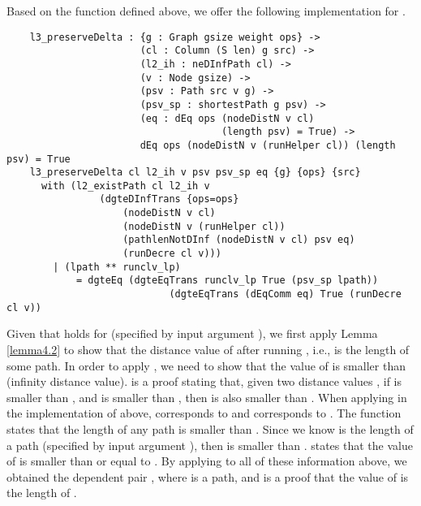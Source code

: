 Based on the  function defined above, we offer the following implementation for . 
\begin{lstlisting}
	l3_preserveDelta : {g : Graph gsize weight ops} ->
	                   (cl : Column (S len) g src) ->
	                   (l2_ih : neDInfPath cl) ->
	                   (v : Node gsize) ->
	                   (psv : Path src v g) ->
	                   (psv_sp : shortestPath g psv) ->
	                   (eq : dEq ops (nodeDistN v cl) 
	                   				 (length psv) = True) ->
	                   dEq ops (nodeDistN v (runHelper cl)) (length psv) = True
	l3_preserveDelta cl l2_ih v psv psv_sp eq {g} {ops} {src}
	  with (l2_existPath cl l2_ih v 
	  			(dgteDInfTrans {ops=ops} 
	  				(nodeDistN v cl) 
	  				(nodeDistN v (runHelper cl)) 
	  				(pathlenNotDInf (nodeDistN v cl) psv eq) 
	  				(runDecre cl v)))
	    | (lpath ** runclv_lp) 
	    	= dgteEq (dgteEqTrans runclv_lp True (psv_sp lpath))
	    					(dgteEqTrans (dEqComm eq) True (runDecre cl v))
\end{lstlisting}

Given that  holds for  (specified by input argument ), we first apply Lemma \ref{lemma4.2}  to show that the distance value of  after running , i.e.,  is the length of some  path. In order to apply , we need to show that the value of  is smaller than  (infinity distance value).  is a proof stating that, given two distance values , if  is smaller than , and  is smaller than , then  is also smaller than . When applying  in the implementation of  above,  corresponds to  and  corresponds to . The  function states that the length of any path is smaller than . Since we know  is the length of a path  (specified by input argument ), then  is smaller than .  states that the value of  is smaller than or equal to . By applying  to all of these information above, we obtained the dependent pair , where  is a  path, and  is a proof that the value of  is the length of . 
\\

